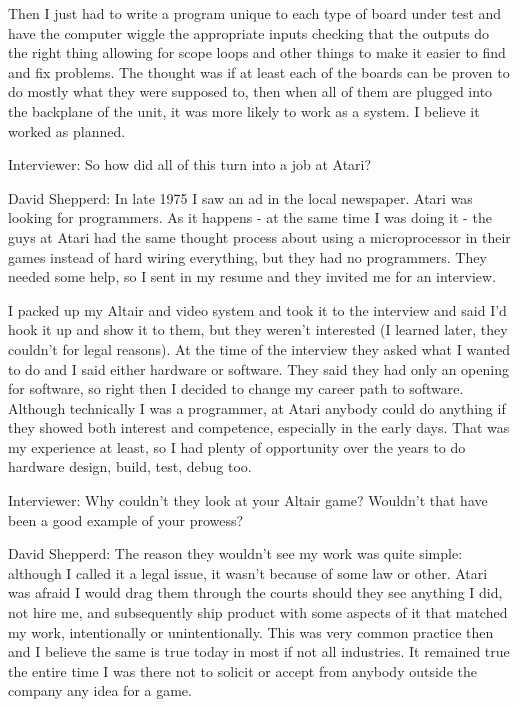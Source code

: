 Then I just had to write a program unique to each type of board under test and have the computer wiggle the appropriate inputs checking that the outputs do the right thing allowing for scope loops and other things to make it easier to find and fix problems. The thought was if at least each of the boards can be proven to do mostly what they were supposed to, then when all of them are plugged into the backplane of the unit, it was more likely to work as a system. I believe it worked as planned.

\textcolor{interviewer}{Interviewer:} So how did all of this turn into a job at Atari?

\textcolor{interviewee}{David Shepperd:} In late 1975 I saw an ad in the local newspaper. Atari was looking for programmers. As it happens - at the same time I was doing it - the guys at Atari had the same thought process about using a microprocessor in their games instead of hard wiring everything, but they had no programmers. They needed some help, so I sent in my resume and they invited me for an interview. 

I packed up my Altair and video system and took it to the interview and said I'd hook it up and show it to them, but they weren't interested (I learned later, they couldn't for legal reasons). At the time of the interview they asked what I wanted to do and I said either hardware or software. They said they had only an opening for software, so right then I decided to change my career path to software. Although technically I was a programmer, at Atari anybody could do anything if they showed both interest and competence, especially in the early days. That was my experience at least, so I had plenty of opportunity over the years to do hardware design, build, test, debug too.

\textcolor{interviewer}{Interviewer:} Why couldn’t they look at your Altair game? Wouldn’t that have been a good example of your prowess?

\textcolor{interviewee}{David Shepperd:} The reason they wouldn't see my work was quite simple: although I called it a legal issue, it wasn't because of some law or other. Atari was afraid I would drag them through the courts should they see anything I did, not hire me, and subsequently ship product with some aspects of it that matched my work, intentionally or unintentionally. This was very common practice then and I believe the same is true today in most if not all industries. It remained true the entire time I was there not to solicit or accept from anybody outside the company any idea for a game. 

